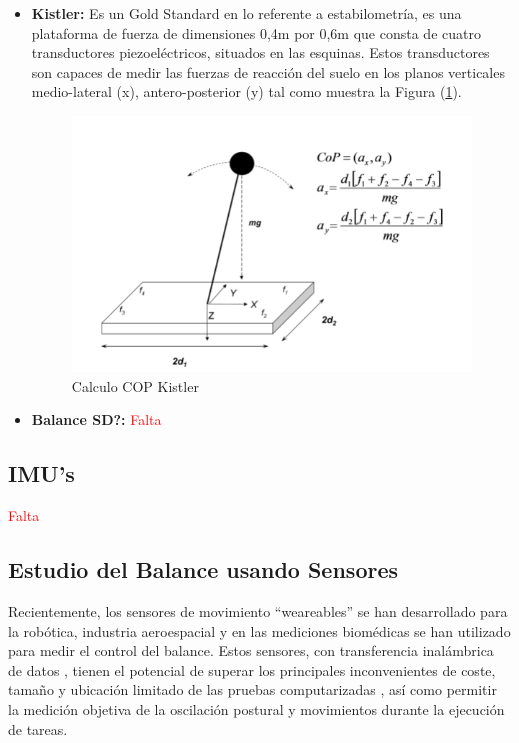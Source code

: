 \documentclass[12pt,a4paper]{article}
\begin{document}
\begin{itemize}
	\item \textbf{Kistler:} Es un Gold Standard  en lo referente a estabilometría\cite{donath_testing_2012}, es una plataforma de fuerza de dimensiones
	0,4m por 0,6m que consta de cuatro 	transductores piezoeléctricos, situados en las esquinas. Estos transductores son capaces de medir las fuerzas de reacción del suelo en los planos verticales medio-lateral (x), antero-posterior (y) tal como muestra la Figura (\ref{fig:Kistler}).

\begin{figure}[H]
	\centering
	\includegraphics[width=0.7\linewidth]{images/Kistler}
	\caption{Calculo COP Kistler}
	\label{fig:Kistler}
\end{figure}

\item \textbf{Balance SD?:} 
\textcolor{red}{Falta}
	 
\end{itemize}

\subsection{IMU's}
\textcolor{red}{Falta}

\subsection{Estudio del Balance usando Sensores}
Recientemente, los sensores de movimiento ``weareables'' se han desarrollado para la robótica, industria aeroespacial y en las mediciones biomédicas se han utilizado para medir el control del balance\cite{mancini_relevance_2010}. Estos sensores, con transferencia inalámbrica de datos , tienen el potencial de superar los principales inconvenientes de coste, tamaño y ubicación limitado de las pruebas computarizadas , así como permitir la medición objetiva de la oscilación postural y movimientos durante la ejecución de tareas.
\end{document}

